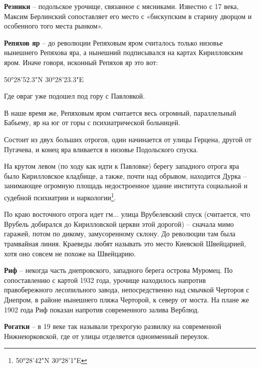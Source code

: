 \medskip

\textbf{Резники} – подольское урочище, связанное с мясниками. Известно с 17 века, Максим Берлинский сопоставляет его место с «бискупским в старину дворцом и особенного того места рынком».\\ 

\medskip

\textbf{Репяхов яр} – до революции Репяховым яром считалось только низовье нынешнего Репяхова яра, а нынешний подписывался на картах Кирилловским яром. Иначе говоря, исконный Репяхов яр это вот:

50°28'52.3"N 30°28'23.3"E

Где овраг уже подошел под гору с Павловкой.

В наше время же, Репяховым яром считается весь огромный, параллельный Бабьему, яр на юг от горы с психиатрической больницей.

Состоит из двух больших отрогов, один начинается от улицы Герцена, другой от Пугачева, и конец яра вливается в низовье Подольского спуска.

На крутом левом (по ходу как идти к Павловке) берегу западного отрога яра было Кирилловское кладбище, а также, почти над обрывом, находится Дурка – занимающее огромную площадь недостроенное здание института социальной и судебной психиатрии и наркологии\footnote{50°28'42"N 30°28'1"E}.

По краю восточного отрога идет гм... улица Врубелевский спуск (считается, что Врубель добирался до Кирилловской церкви этой дорогой) – сначала мимо гаражей, потом по дикому, замусоренному склону. До революции там была трамвайная линия. Краеведы любят называть это место Киевской Швейцарией, хотя оно совсем не похоже на Швейцарию.\\

\medskip

\textbf{Риф} – некогда часть днепровского, западного берега острова Муромец. По сопоставлению с картой 1932 года, урочище находилось напротив правобережного лесопильного завода, непосредственно над смычкой Чертороя с Днепром, в районе нынешнего пляжа Черторой, к северу от моста. На плане же 1902 года Риф показан напротив современного залива Верблюд.\\

\medskip

\textbf{Рогатки} – в 19 веке так называли трехрогую развилку на современной Нижнеюрковской, где от улицы отделяется одноименный переулок.\\

